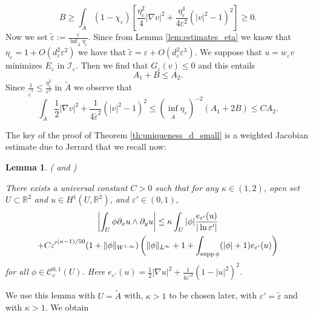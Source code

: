 \documentclass[12pt,reqno]{amsart}
\newtheorem{lemma}[theorem]{Lemma}
\def\A{{\tilde{A}}}
\def\C{{\mathcal C}}
\def\I{{\mathcal I}}
\def\e {{\varepsilon}}
\def\supp{{\rm supp\,}}
\def \p {\partial}
\newcommand{\R}{\mathbb{R}}
\numberwithin{equation}{section}
\begin{document}
\begin{equation}\label{eq:(4.36)}
B \geq \int_{\A}(1-\chi_\e)\left[ \frac{\eta_\e^2}{4}|\nabla v|^2+\frac{\eta_\e^4}{4\e^2}(|v|^2-1)^2\right]\geq 0.
\end{equation}
Now we set \(\tilde{\e}:=\frac{\e}{\inf_{\A}\eta_\e}\). Since from Lemma \ref{lem:estimates_eta} we know that \(\eta_\e=1+O(d_\e^2 \e^2)\) we have that \(\tilde{\e}=\e+O(d_\e^2\e^3)\). We suppose that \(u=w_\e v\) minimizes \(E_\e\) in \(\I_\e\). Then we find that \(G_\e(v)\leq 0\) and this entails
\begin{equation}\label{eq:inegA1A2B}
A_1+B\leq A_2.
\end{equation} Since \(\frac{1}{\tilde{\e}^2}\leq \frac{\eta_\e^2}{\e^2}\) in \(\A\) we observe that 
\begin{equation}\label{**}
\int_{\A} \frac12 |\nabla v|^2+\frac{1}{4\tilde{\e}^2}(|v|^2-1)^2\leq (\inf_{\A}\eta_\e)^{-2}(A_1+2B)\leq CA_2.
\end{equation}


The key of the proof of Theorem \ref{th:uniqueness_d_small} is a weighted Jacobian estimate due to Jerrard that we recall now:

\begin{lemma}(\cite[Lemma 8]{Jerrard_2007} and \cite[Lemma 4.1]{Aftalion_Jerrard_RoyoLetelier_2011})\label{lem:weighted_jac_est}

There exists a universal constant \(C>0\) such that for any \(\kappa \in (1,2)\), open set \(U\subset \R^2\) and \(u\in H^1(U,\R^2)\), and \(\e'\in (0,1)\),
\begin{multline*}
\left|\int_U \phi \p_xu \wedge \p_y u\right|\leq \kappa \int_U |\phi| \frac{e_{\e'}(u)}{|\ln \e'|}\\
+C{\e'}^{(\kappa-1)/50}(1+\|\phi\|_{W^{1,\infty}})\left(\|\phi\|_{L^\infty}+1+\int_{\supp \phi}(|\phi|+1)e_{\e'}(u) \right)
\end{multline*}
for all \(\phi \in \C^{0,1}_c(U)\). Here \(e_{\e'}(u)=\frac12 |\nabla u|^2+\frac{1}{4{\e'}^2}(1-|u|^2)^2\).
\end{lemma}

 We use this lemma with \(U=\tilde{A}\) with, \(\kappa>1\) to be chosen later, with \(\e'=\tilde{\e}\) and with \(\kappa>1\). We obtain
\end{document}
